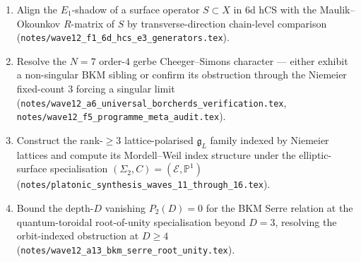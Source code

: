 \documentclass[11pt]{article}
\providecommand{\Eone}{E_1}
\providecommand{\fg}{\mathfrak{g}}
\begin{document}
\begin{enumerate}[leftmargin=2em]
\item Align the $\Eone$-shadow of a surface operator $S \subset X$
in 6d hCS with the Maulik--Okounkov $R$-matrix of $S$ by
transverse-direction chain-level comparison
(\texttt{notes/wave12\_f1\_6d\_hcs\_e3\_generators.tex}).

\item Resolve the $N = 7$ order-$4$ gerbe Cheeger--Simons character
--- either exhibit a non-singular BKM sibling or confirm its
obstruction through the Niemeier fixed-count $3$ forcing a singular
limit
(\texttt{notes/wave12\_a6\_universal\_borcherds\_verification.tex},
\texttt{notes/wave12\_f5\_programme\_meta\_audit.tex}).

\item Construct the rank-$\geq 3$ lattice-polarised $\fg_L$ family
indexed by Niemeier lattices and compute its Mordell--Weil index
structure under the elliptic-surface specialisation $(\Sigma_2, C)
= (\mathcal{E}, \mathbb{P}^1)$
(\texttt{notes/platonic\_synthesis\_waves\_11\_through\_16.tex}).

\item Bound the depth-$D$ vanishing $P_2(D) = 0$ for the BKM Serre
relation at the quantum-toroidal root-of-unity specialisation
beyond $D = 3$, resolving the orbit-indexed obstruction at $D \geq 4$
(\texttt{notes/wave12\_a13\_bkm\_serre\_root\_unity.tex}).

\end{enumerate}
\end{document}
